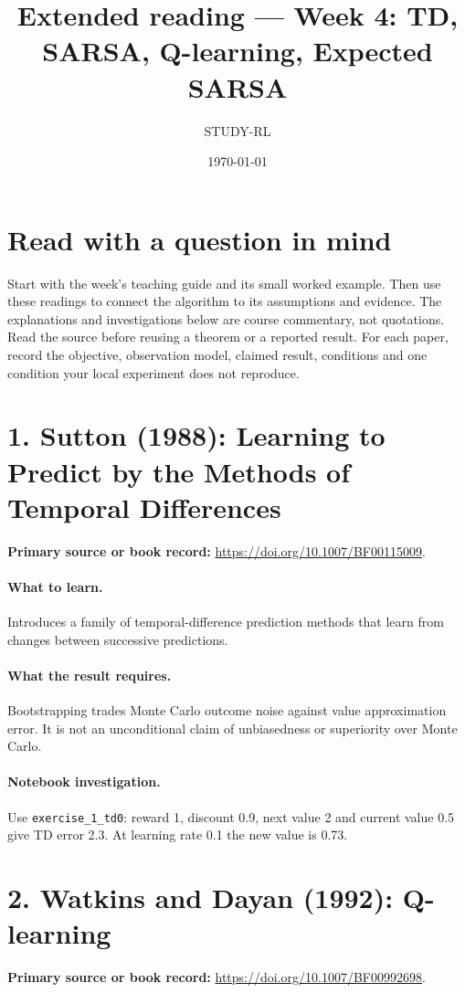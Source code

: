 \documentclass[11pt]{scrartcl}
\title{Extended reading --- Week 4: TD, SARSA, Q-learning, Expected SARSA}
\author{STUDY-RL}
\date{\today}
\begin{document}
\maketitle
\section*{Read with a question in mind}
Start with the week's teaching guide and its small worked example. Then use
these readings to connect the algorithm to its assumptions and evidence.
The explanations and investigations below are course commentary, not
quotations. Read the source before reusing a theorem or a reported result.
For each paper, record the objective, observation model, claimed result,
conditions and one condition your local experiment does not reproduce.

\section*{1. Sutton (1988): Learning to Predict by the Methods of Temporal Differences}
\textbf{Primary source or book record:} \url{https://doi.org/10.1007/BF00115009}.

\paragraph{What to learn.} Introduces a family of temporal-difference prediction methods that learn from changes between successive predictions.

\paragraph{What the result requires.} Bootstrapping trades Monte Carlo outcome noise against value approximation error. It is not an unconditional claim of unbiasedness or superiority over Monte Carlo.

\paragraph{Notebook investigation.} Use \texttt{exercise\_1\_td0}: reward 1, discount 0.9, next value 2 and current value 0.5 give TD error 2.3. At learning rate 0.1 the new value is 0.73.

\section*{2. Watkins and Dayan (1992): Q-learning}
\textbf{Primary source or book record:} \url{https://doi.org/10.1007/BF00992698}.
\end{document}

